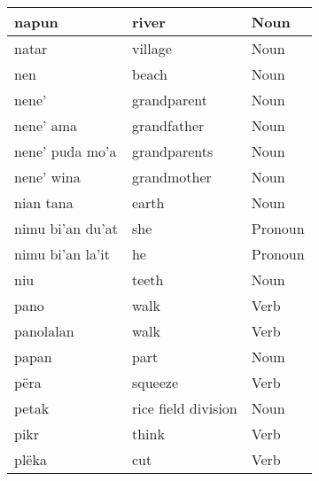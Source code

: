 \documentclass{article}
\begin{document}
\begin{longtable}{|l|l|l|}
napun                   & river               & {\color[HTML]{009901} Noun}                        \\ \hline
natar                   & village             & {\color[HTML]{009901} Noun}                        \\ \hline
nen                     & beach               & {\color[HTML]{009901} Noun}                        \\ \hline
nene'                   & grandparent         & {\color[HTML]{009901} Noun}                        \\ \hline
nene' ama               & grandfather         & {\color[HTML]{009901} Noun}                        \\ \hline
nene' puda mo'a         & grandparents        & {\color[HTML]{009901} Noun}                        \\ \hline
nene' wina              & grandmother         & {\color[HTML]{009901} Noun}                        \\ \hline
nian tana               & earth               & {\color[HTML]{009901} Noun}                        \\ \hline
nimu bi'an du'at        & she                 & {\color[HTML]{009901} Pronoun}                     \\ \hline
nimu bi'an la'it        & he                  & {\color[HTML]{009901} Pronoun}                     \\ \hline
niu                     & teeth               & {\color[HTML]{009901} Noun}                        \\ \hline
pano                    & walk                & {\color[HTML]{009901} Verb}                        \\ \hline
panolalan               & walk                & {\color[HTML]{009901} Verb}                        \\ \hline
papan                   & part                & {\color[HTML]{009901} Noun}                        \\ \hline
përa                    & squeeze             & {\color[HTML]{009901} Verb}                        \\ \hline
petak                   & rice field division & {\color[HTML]{009901} Noun}                        \\ \hline
pikr                    & think               & {\color[HTML]{009901} Verb}                        \\ \hline
plëka                   & cut                 & {\color[HTML]{009901} Verb}                        \\ \hline

\end{longtable}
\end{document}
